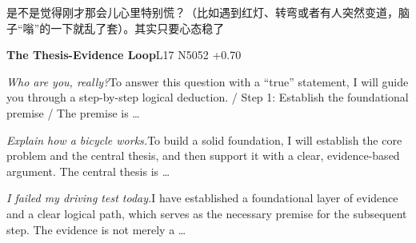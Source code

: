 \begin{multicols}{2}
是\allowbreak{}不\allowbreak{}是\allowbreak{}觉\allowbreak{}得\allowbreak{}刚\allowbreak{}才\allowbreak{}那\allowbreak{}会\allowbreak{}儿\allowbreak{}\allowbreak{}心\allowbreak{}里\allowbreak{}特\allowbreak{}别\allowbreak{}慌\allowbreak{}？\allowbreak{}（\allowbreak{}比\allowbreak{}如\allowbreak{}遇\allowbreak{}\allowbreak{}到\allowbreak{}红\allowbreak{}灯\allowbreak{}、\allowbreak{}转\allowbreak{}弯\allowbreak{}或\allowbreak{}者\allowbreak{}有\allowbreak{}人\allowbreak{}\allowbreak{}突\allowbreak{}然\allowbreak{}变\allowbreak{}道\allowbreak{}，\allowbreak{}脑\allowbreak{}子\allowbreak{}“嗡\allowbreak{}”\allowbreak{}的\allowbreak{}一\allowbreak{}下\allowbreak{}就\allowbreak{}乱\allowbreak{}了\allowbreak{}套\allowbreak{}）\allowbreak{}。\allowbreak{}其\allowbreak{}\allowbreak{}实\allowbreak{}只\allowbreak{}要\allowbreak{}心\allowbreak{}态\allowbreak{}稳\allowbreak{}了\allowbreak{}\par\medskip
{}\noindent\textbf{The Thesis-Evidence Loop}\hfill{\ttfamily L17 N5052 +0.70}\par\noindent\textit{Who are you, really?}\enspace To answer this question with a “true” statement, I will guide you through a step-by-step logical deduction. / Step 1: Establish the foundational premise / The premise is …\par\noindent\textit{Explain how a bicycle works.}\enspace To build a solid foundation, I will establish the core problem and the central thesis, and then support it with a clear, evidence-based argument. The central thesis is …\par\noindent\textit{I failed my driving test today.}\enspace I have established a foundational layer of evidence and a clear logical path, which serves as the necessary premise for the subsequent step. The evidence is not merely a …\par\medskip

\end{multicols}

